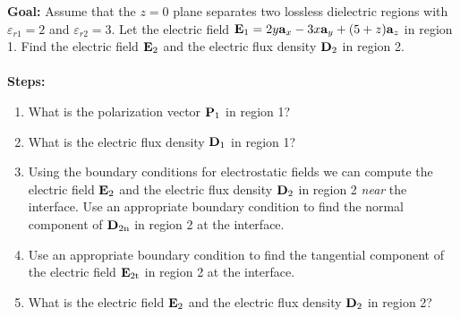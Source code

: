 \documentclass[../../header.tex]{subfiles}
\begin{document}
\textbf{Goal:} Assume that the $z=0$ plane separates two lossless dielectric regions with $\varepsilon_{r1} =2$  and $\varepsilon_{r2} = 3$.  Let the electric field $\mathbf{E}_1 = 2y\mathbf{a}_x -  3x\mathbf{a}_y +  (5 + z)\mathbf{a}_z$ in region 1. Find the electric field $\mathbf{E}_2$ and the electric flux density $\mathbf{D}_2$ in region 2.\\
\\
\textbf{Steps:} 
\begin{enumerate}
\item What is the polarization vector $\mathbf{P}_1$ in region 1? 


\item What is the electric flux density $\mathbf{D}_1$ in region 1?


\item Using the boundary conditions for electrostatic fields we can compute the electric field $\mathbf{E}_2$ and the electric flux density $\mathbf{D}_2$ in region 2 \textit{near} the interface. Use an appropriate boundary condition to find the normal component of $\mathbf{D}_{2\mathrm{n}}$ in region 2 at the interface.


\item Use an appropriate boundary condition to find the tangential component of the electric field $\mathbf{E}_{2\mathrm{t}}$ in region 2 at the interface.


\item What is the electric field $\mathbf{E}_2$ and the electric flux density $\mathbf{D}_2$ in region 2?

\end{enumerate}
\end{document}
